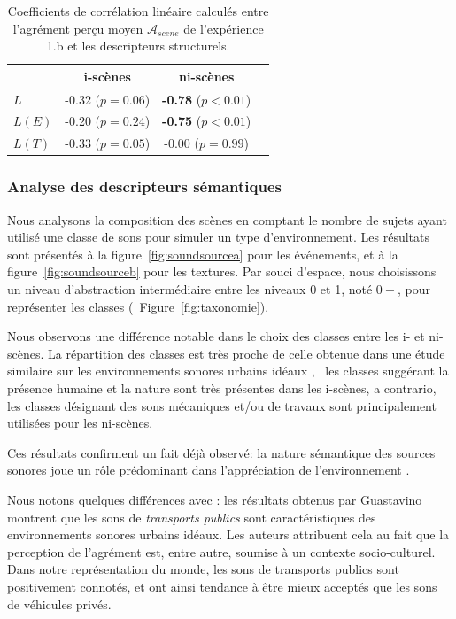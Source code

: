\documentclass[twoside,twocolumn]{article}
\begin{document}
\begin{table}[t]
\centering
\begin{tabular}{l c c c}
               & i-scènes                   & ni-scènes    \\
\hline
$L$            & -0.32 ($p=0.06$)           & \textbf{-0.78} ($p<0.01$)\\
$L(E)$         & -0.20 ($p=0.24$)           & \textbf{-0.75} ($p<0.01$)\\
$L(T)$         & -0.33 ($p=0.05$)           &  -0.00 ($p=0.99$) \\
\hline
\end{tabular}
\vspace{0.5mm}
\caption{Coefficients de corrélation linéaire calculés entre l'agrément perçu moyen $\mathcal{A}_{scene}$ de l'expérience 1.b et les descripteurs structurels.}
\label{tab:corrStructA}
\end{table}

\subsubsection*{Analyse des descripteurs sémantiques}

Nous analysons la composition des scènes en comptant le nombre de sujets ayant utilisé une classe de sons pour simuler un type d'environnement. Les résultats sont présentés à la figure~\ref{fig:soundsourcea} pour les événements, et à la figure~\ref{fig:soundsourceb} pour les textures. Par souci d'espace, nous choisissons un niveau d'abstraction intermédiaire entre les niveaux 0 et 1, noté $0+$, pour représenter les classes (\cf~Figure~\ref{fig:taxonomie}).

Nous observons une différence notable dans le choix des classes entre les i- et ni-scènes. La répartition des classes est très proche de celle obtenue dans une étude similaire sur les environnements sonores urbains idéaux \cite{guastavino2006ideal}, \ie~les classes suggérant la présence humaine et la nature sont très présentes dans les i-scènes, a contrario, les classes désignant des sons mécaniques et/ou de travaux sont principalement utilisées pour les ni-scènes.

Ces résultats confirment un fait déjà observé: la nature sémantique des sources sonores joue un rôle prédominant dans l'appréciation de l'environnement \cite{raimbault2005urban,dubois2006cognitive}.

Nous notons quelques différences avec \cite{guastavino2006ideal}: les résultats obtenus par Guastavino montrent que les sons de \emph{transports publics} sont caractéristiques des environnements sonores urbains idéaux. Les auteurs attribuent cela au fait que la perception de l'agrément est, entre autre, soumise à un contexte socio-culturel. Dans notre représentation du monde, les sons de transports publics sont positivement connotés, et ont ainsi tendance à être mieux acceptés que les sons de véhicules privés.
\end{document}

